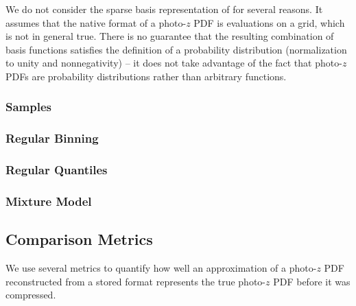 \documentclass[\docopts]{\docclass}
\begin{document}
We do not consider the sparse basis representation of \citet{carrasco_kind_sparse_2014} for several reasons.  It assumes that the native format of a photo-$z$ PDF is evaluations on a grid, which is not in general true.  There is no guarantee that the resulting combination of basis functions satisfies the definition of a probability distribution (normalization to unity and nonnegativity) -- it does not take advantage of the fact that photo-$z$ PDFs are probability distributions rather than arbitrary functions.  

\subsubsection{Samples}
\label{sec:samples}

\subsubsection{Regular Binning}
\label{sec:bins}

\subsubsection{Regular Quantiles}
\label{sec:quantiles}

\subsubsection{Mixture Model}
\label{sec:gmm}

\subsection{Comparison Metrics}
\label{sec:metrics}


We use several metrics to quantify how well an approximation of a photo-$z$ PDF reconstructed from a stored format represents the true photo-$z$ PDF before it was compressed.

\end{document}
